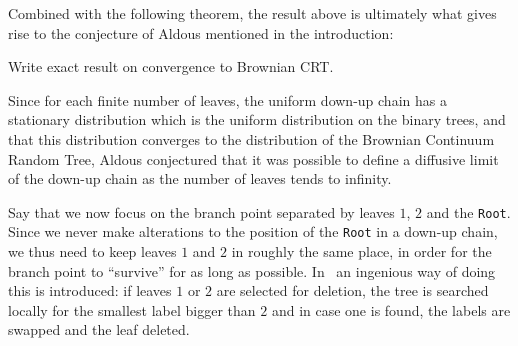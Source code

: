 Combined with the following theorem, the result above is ultimately what gives rise to the conjecture of Aldous mentioned in the introduction:
%
\begin{thm}
    Write exact result on convergence to Brownian CRT.
\end{thm}
%
Since for each finite number of leaves, the uniform down-up chain has a stationary distribution which is the uniform distribution on the binary trees, and that this distribution converges to the distribution of the Brownian Continuum Random Tree, Aldous conjectured that it was possible to define a diffusive limit of the down-up chain as the number of leaves tends to infinity.


Say that we now focus on the branch point separated by leaves $1$, $2$ and the \verb|Root|.
Since we never make alterations to the position of the \verb|Root| in a down-up chain, we thus need to keep leaves $1$ and $2$ in roughly the same place, in order for the branch point to ``survive'' for as long as possible.
In~\cite{RefWorks:doc:5b4cbc93e4b07f5746e47014} an ingenious way of doing this is introduced:
if leaves $1$ or $2$ are selected for deletion, the tree is searched locally for the smallest label bigger than $2$ and in case one is found, the labels are swapped and the leaf deleted.

